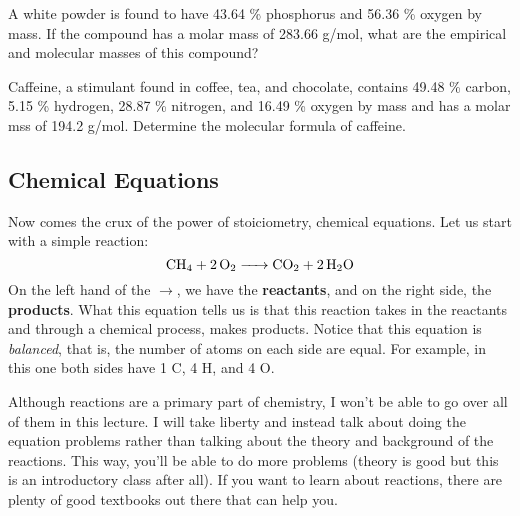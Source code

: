 \begin{problem}
A white powder is found to have 43.64 \% phosphorus and 56.36 \% oxygen by mass. If the compound has a molar mass of 283.66 g/mol, what are the empirical and molecular masses of this compound?
\end{problem}
\begin{problem}
Caffeine, a stimulant found in coffee, tea, and chocolate, contains 49.48 \% carbon, 5.15 \% hydrogen, 28.87 \% nitrogen, and 16.49 \% oxygen by mass and has a molar mss of 194.2 g/mol. Determine the molecular formula of caffeine.
\end{problem}
\subsection{Chemical Equations}
Now comes the crux of the power of stoiciometry, chemical equations. Let us start with a simple reaction:
$$\ce{CH4 + 2O2 -> CO2 + 2H2O}$$
On the left hand of the $\rightarrow$, we have the \textbf{reactants}, and on the right side, the \textbf{products}. What this equation tells us is that this reaction takes in the reactants and through a chemical process, makes products. Notice that this equation is \textit{balanced}, that is, the number of atoms on each side are equal. For example, in this one both sides have 1 C, 4 H, and 4 O. \par
Although reactions are a primary part of chemistry, I won't be able to go over all of them in this lecture. I will take liberty and instead talk about doing the equation problems rather than talking about the theory and background of the reactions. This way, you'll be able to do more problems (theory is good but this is an introductory class after all). If you want to learn about reactions, there are plenty of good textbooks out there that can help you. \par
